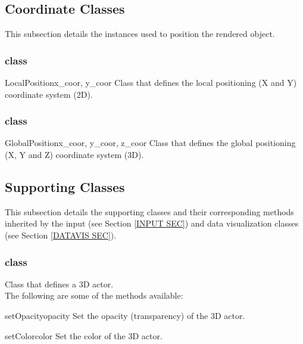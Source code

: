 \subsection{Coordinate Classes}
This subsection details the instances used to position the rendered object.

\subsubsection{\LocalPosition class}

\begin{classdesc}{LocalPosition}{x_coor, y_coor}
Class that defines the local positioning (X and Y) coordinate system (2D).
\end{classdesc}

\subsubsection{\GlobalPosition class}

\begin{classdesc}{GlobalPosition}{x_coor, y_coor, z_coor}
Class that defines the global positioning (X, Y and Z) coordinate system (3D).
\end{classdesc}




\subsection{Supporting Classes}
This subsection details the supporting classes and their corresponding methods 
inherited by the input (see Section \ref{INPUT SEC}) and data 
visualization classes (see Section \ref{DATAVIS SEC}).

\subsubsection{\ActorThreeD class}
Class that defines a 3D actor. \\

The following are some of the methods available:

\begin{methoddesc}[Actor3D]{setOpacity}{opacity}
Set the opacity (transparency) of the 3D actor.
\end{methoddesc}

\begin{methoddesc}[Actor3D]{setColor}{color}
Set the color of the 3D actor.
\end{methoddesc}

